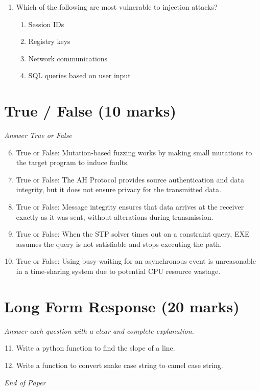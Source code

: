 \documentclass[12pt]{article}
\begin{document}
\begin{enumerate}[label=\arabic*.]
\begin{enumerate}[label=(\alph*)]
    \item The return address
    \item Stack pointer for the calling activation record
\end{enumerate}
\item Which of the following are most vulnerable to injection attacks?
\begin{enumerate}[label=(\alph*)]
    \item Session IDs
    \item Registry keys
    \item Network communications
    \item SQL queries based on user input
\end{enumerate}
\end{enumerate}

\section*{True / False (10 marks)}
\textit{Answer True or False}
\begin{enumerate}[label=\arabic*.]
\setcounter{enumi}{5}
\item True or False: Mutation-based fuzzing works by making small mutations to the target program to induce faults.
\item True or False: The AH Protocol provides source authentication and data integrity, but it does not ensure privacy for the transmitted data.
\item True or False: Message integrity ensures that data arrives at the receiver exactly as it was sent, without alterations during transmission.
\item True or False: When the STP solver times out on a constraint query, EXE assumes the query is not satisfiable and stops executing the path.
\item True or False: Using busy-waiting for an asynchronous event is unreasonable in a time-sharing system due to potential CPU resource wastage.
\end{enumerate}

\section*{Long Form Response (20 marks)}
\textit{Answer each question with a clear and complete explanation.}
\begin{enumerate}[label=\arabic*.]
\setcounter{enumi}{10}
\item Write a python function to find the slope of a line.
\item Write a function to convert snake case string to camel case string.
\end{enumerate}

\vfill
\noindent\textit{End of Paper}
\end{document}
